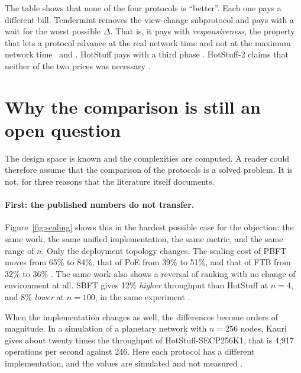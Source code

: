 The table shows that none of the four protocols is \enquote{better}. Each
one pays a different bill. Tendermint removes the view-change
subprotocol and pays with a wait for the worst possible $\Delta$. That
is, it pays with \emph{responsiveness}, the property that lets a protocol
advance at the real network time and not at the maximum network time
\cite{buchman2018gossip}\prep\ and \cite{malkhi2023hotstuff2}\prep.
HotStuff pays with a third phase \cite{yin2019hotstuff}. HotStuff-2
claims that neither of the two prices was necessary
\cite{malkhi2023hotstuff2}\prep.

\section{Why the comparison is still an open question}
\label{sec:opengap}

The design space is known and the complexities are computed. A reader
could therefore assume that the comparison of the protocols is a solved
problem. It is not, for three reasons that the literature itself
documents.

\paragraph{First: the published numbers do not transfer.}
Figure~\ref{fig:scaling} shows this in the hardest possible case for the
objection: the same work, the same unified implementation, the same
metric, and the same range of $n$. Only the deployment topology changes.
The scaling cost of PBFT moves from 65\% to 84\%, that of PoE from 39\%
to 51\%, and that of FTB from 32\% to 36\% \cite{amiri2024bedrock}. The
same work also shows a reversal of ranking with no change of environment
at all. SBFT gives 12\% \emph{higher} throughput than HotStuff at $n=4$,
and 8\% \emph{lower} at $n=100$, in the same experiment
\cite{amiri2024bedrock}.

When the implementation changes as well, the differences become orders of
magnitude. In a simulation of a planetary network with $n=256$ nodes,
Kauri gives about twenty times the throughput of HotStuff-SECP256K1, that
is 4,917 operations per second against 246. Here each protocol has a
different implementation, and the values are simulated and not measured
\cite{berger2023simulation}.

